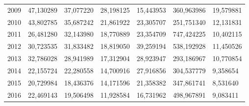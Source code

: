 \begin{table}
\begin{tabular}{p{1cm}p{2cm}p{2cm}p{2cm}p{2cm}p{2cm}p{2cm}}
 2009 &                 47,130289 &                       37,077220 &                                   28,198125 &                             15,443953 & 360,963986 &                           19,579881 \\
 2010 &                 43,802785 &                       35,687242 &                                   21,861922 &                             23,305707 & 251,751340 &                           12,131831 \\
 2011 &                 26,481280 &                       32,143980 &                                   18,770889 &                             23,354709 & 747,424225 &                           10,402115 \\
 2012 &                 30,723535 &                       31,833482 &                                   18,819050 &                             39,259194 & 538,192928 &                           11,450526 \\
 2013 &                 32,786028 &                       28,941989 &                                   17,312904 &                             28,923947 & 293,186967 &                           10,770854 \\
 2014 &                 22,155724 &                       22,280558 &                                   14,700916 &                             27,916856 & 304,537779 &                            9,358654 \\
 2015 &                 20,729984 &                       18,436376 &                                   14,171596 &                             21,358382 & 347,861741 &                            8,531640 \\
 2016 &                 22,469143 &                       19,506498 &                                   11,928584 &                             16,731962 & 498,967891 &                            9,083411 \\
\bottomrule
\end{tabular}
\end{table}
